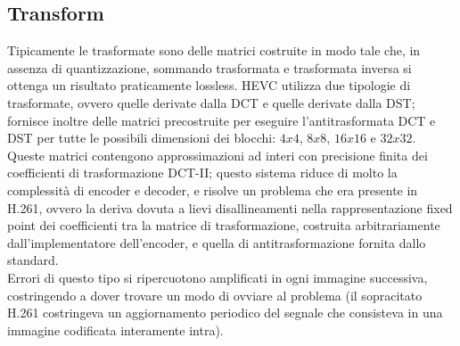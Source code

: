 \subsection{Transform}
Tipicamente le trasformate sono delle matrici costruite in modo tale che, in 
assenza di quantizzazione, sommando trasformata e trasformata inversa si 
ottenga un risultato praticamente lossless.
HEVC utilizza due tipologie di trasformate, ovvero quelle derivate dalla DCT e
quelle derivate dalla DST; fornisce inoltre delle matrici precostruite per 
eseguire l'antitrasformata DCT e DST per tutte le possibili dimensioni dei 
blocchi: $4x4$, $8x8$, $16x16$ e $32x32$.
Queste matrici contengono approssimazioni ad interi con precisione finita dei 
coefficienti di trasformazione DCT-II; questo sistema riduce di molto la 
complessità di encoder e decoder, e risolve un problema che era presente in 
H.261, ovvero la deriva dovuta a lievi disallineamenti nella rappresentazione 
fixed point dei coefficienti tra la matrice di trasformazione, costruita 
arbitrariamente dall'implementatore dell'encoder, e quella di antitrasformazione 
fornita dallo standard. \\
Errori di questo tipo si ripercuotono amplificati in ogni immagine successiva, 
costringendo a dover trovare un modo di ovviare al problema (il sopracitato 
H.261 costringeva un aggiornamento periodico del segnale che consisteva in una 
immagine codificata interamente intra).


